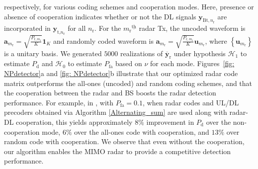 \documentclass[10pt,journal]{IEEEtran}
\newcommand{\paren}[1]{\left({#1}\right)}
\newcommand{\braces}[1]{{\left\{ {#1}\right\}}}
\newcommand{\ith}[1]    {{#1}^{\underline{\text{th}}}}
\newcommand{\rr}{_\mathrm{r}}
\theoremstyle{definition}
\begin{document}
respectively, for various coding schemes and cooperation modes. Here, presence or absence of cooperation indicates whether or not the DL signals $\mathbf{y}_{\textrm{Bt},n\rr}$ are incorporated in $\mathbf{y}_{\textrm{t,}n\rr}$ for all $n\rr$. For the $\ith{m\rr}$ radar Tx, the uncoded waveform is $\mathbf{a}_{m\rr}=\sqrt{\frac{\mathit{P}_{\textrm{r},m\rr}}{\mathit{K}}}\mathbf{1}_{\mathit{K}}$ and randomly coded waveform is  $\mathbf{a}_{m\rr}=\sqrt{\frac{\mathit{P}_{\textrm{r},m\rr}}{\mathit{K}}}\mathbf{u}_{m\rr}$, where $\braces{\mathbf{u}_{m\rr}}$ is a unitary basis. We generated $5000$ realizations of $\overline{\mathbf{y}}_{\textrm{r}}$ under hypothesis $\mathcal{H}_1$ to estimate $\mathit{P}_{\textrm{d}}$ and $\mathcal{H}_0$ to estimate $\mathit{P}_{\textrm{fa}}$ based on $\nu$ for each mode. Figures~\ref{fig: NPdetector}a and \ref{fig: NPdetector}b illustrate that our optimized radar code matrix outperforms the all-ones (uncoded) and random coding schemes, and that the cooperation between the radar and BS boosts the radar detection performance. For example, in , with $P_{\textrm{fa}}=0.1$, when radar codes and UL/DL precoders obtained via Algorithm \ref{Alternating_sum} are used along with radar-DL cooperation, this yields approximately $8\%$ improvement in $P_{\textrm{d}}$ over the non-cooperation mode, $6\%$ over the all-ones code with cooperation, and $13\%$ over random code with cooperation. We observe that even without the cooperation, our algorithm enables the MIMO radar to provide a competitive detection performance.

\end{document}
